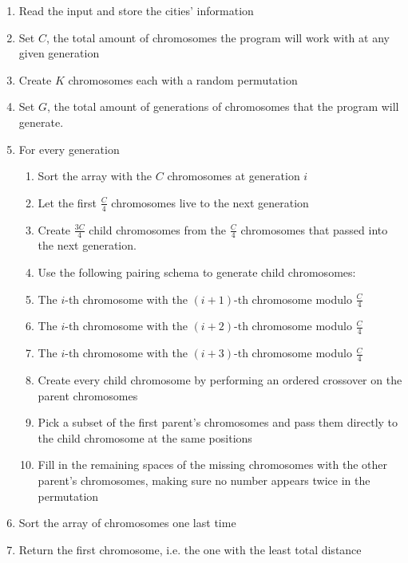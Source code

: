 \documentclass[twoside,twocolumn]{article}
\begin{document}
  \begin{enumerate}
  \item Read the input and store the cities’ information
  \item Set $C$, the total amount of chromosomes the program will work with at any given generation
  \item Create $K$ chromosomes each with a random permutation
  \item Set $G$, the total amount of generations of chromosomes that the program will generate.
  \item For every generation
  \begin{enumerate}
  \item Sort the array with the $C$ chromosomes at generation $i$
  \item Let the first $\frac{C}{4}$ chromosomes live to the next generation
  \item Create $\frac{3C}{4}$ child chromosomes from the $\frac{C}{4}$ chromosomes that passed into the next generation.
  \item Use the following pairing schema to generate child chromosomes:
  \item The $i$-th chromosome with the $(i + 1)$-th chromosome modulo $\frac{C}{4}$
  \item The $i$-th chromosome with the $(i + 2)$-th chromosome modulo $\frac{C}{4}$
  \item The $i$-th chromosome with the $(i + 3)$-th chromosome modulo $\frac{C}{4}$
  \item Create every child chromosome by performing an ordered crossover on the parent chromosomes
  \item Pick a subset of the first parent’s chromosomes and pass them directly to the child chromosome at the same positions 
  \item  Fill in the remaining spaces of the missing chromosomes with the other parent’s chromosomes, making sure no number appears twice in the permutation
  \end{enumerate}
  \item Sort the array of chromosomes one last time
  \item  Return the first chromosome, i.e. the one with the least total distance
  \end{enumerate}
  
\end{document}
